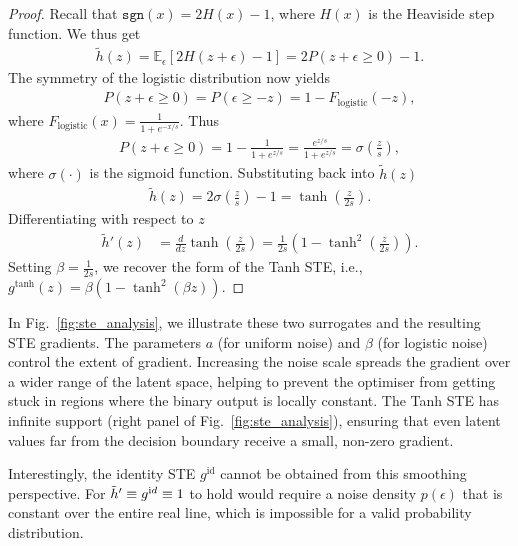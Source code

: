 \documentclass[lettersize,journal]{IEEEtran}
\providecommand{\E}{{\mathbb E}}
\begin{document}
\begin{proof}
    Recall that $\texttt{sgn}(x) = 2H(x) - 1$, where $H(x)$ is the Heaviside step function. 
    We thus get
    \begin{align}
        \tilde{h}(z) = \E_\epsilon [2H(z+\epsilon) - 1] = 2 P(z + \epsilon \ge 0) - 1.
    \end{align}
    The symmetry of the logistic distribution now yields
    \begin{align}
        P(z + \epsilon \ge 0) = P(\epsilon \ge -z) = 1 - F_{\text{logistic}}(-z),
    \end{align}
    where $F_{\text{logistic}}(x) = \frac{1}{1 + e^{-x/s}}$. Thus
    \begin{align}
        P(z + \epsilon \ge 0) = 1 - \frac{1}{1 + e^{z/s}} = \frac{e^{z/s}}{1 + e^{z/s}} = \sigma\left(\frac{z}{s}\right),
    \end{align}
    where $\sigma(\cdot)$ is the sigmoid function. Substituting back into $\tilde{h}(z)$
    \begin{align}
        \tilde{h}(z) = 2 \sigma\left(\frac{z}{s}\right) - 1 = \tanh\left(\frac{z}{2s}\right).
    \end{align}
    Differentiating with respect to $z$
    \begin{align}
        \tilde{h}'(z) &= \frac{d}{dz} \tanh\left(\frac{z}{2s}\right) = \frac{1}{2s} \left( 1 - \tanh^2\left(\frac{z}{2s}\right) \right).
    \end{align}
    Setting $\beta = \frac{1}{2s}$, we recover the form of the Tanh STE, i.e., $g^\text{tanh}(z) = \beta(1 - \tanh^2(\beta z))$.
\end{proof}
In Fig.~\ref{fig:ste_analysis}, we illustrate these two surrogates and the resulting STE gradients.
The parameters $a$ (for uniform noise) and $\beta$ (for logistic noise) control the extent of gradient. 
Increasing the noise scale spreads the gradient over a wider range of the latent space, helping to prevent the optimiser from getting stuck in regions where the binary output is locally constant. 
The Tanh STE has infinite support (right panel of Fig.~\ref{fig:ste_analysis}), ensuring that even latent values far from the decision boundary receive a small, non-zero gradient.

Interestingly, the identity STE $g^\text{id}$ cannot be obtained from this smoothing perspective.
For $\tilde{h}'\equiv g^{\text id}\equiv 1$ to hold would require a noise density $p(\epsilon)$ that is constant over the entire real line, which is impossible for a valid probability distribution. 
\end{document}
